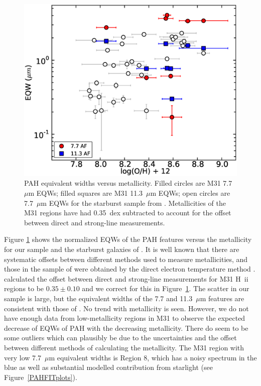 \begin{figure}
\centering
\includegraphics[scale=0.27]{./fig12.eps}
\caption{ PAH equivalent widths versus metallicity. 
Filled circles are M31 7.7~$\mu$m EQWs; filled squares are M31 11.3~$\mu$m EQWs; 
open circles are 7.7~$\mu$m EQWs for the starburst sample from \citet{Engelbracht_2008}.
Metallicities of the M31 regions have had 0.35~dex subtracted to account for the offset  between direct and strong-line measurements. 
}
\label{metalicityVseqw}
\end{figure}

Figure \ref{metalicityVseqw} shows the normalized EQWs of the PAH features  versus the metallicity for our sample and the starburst 
galaxies of \citet{Engelbracht_2008}. 
 It is well known that there are systematic offsets between different 
 methods used to measure metallicities, and those in the sample of \citet{Engelbracht_2008} 
 were obtained by the direct electron temperature method  \citep{Skillman1998}.
\citet{Mitchel2014} calculated the offset between direct and strong-line measurements for M31 H~{\sc ii} regions to be 
$0.35\pm0.10$ and we correct for this in Figure~\ref{metalicityVseqw}.
The scatter in our sample is large, but the 	
equivalent widths of the 7.7 and 11.3~$\mu$m features are consistent with those of \citet{Engelbracht_2008}. 
No trend with metallicity is seen.
However, we do not have enough data from low-metallicity regions in M31 to observe the expected decrease of EQWs of PAH with the decreasing 
metallicity.  There do seem to be some outliers which can plausibly be due to the uncertainties  and the offset between different methods of calculating the metallicity.  
The M31 region with very low  7.7~$\mu$m  equivalent widths is Region 8, which has
a noisy spectrum in the blue as well as substantial modelled contribution from starlight (see Figure~\ref{PAHFITplots}).

